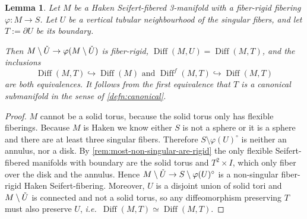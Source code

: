 \documentclass{amsart}
\theoremstyle{plain}
\newtheorem{lem}[thm]{Lemma}
\theoremstyle{definition}
\DeclareMathOperator\Diff{Diff}
\newcommand{\interior}[1]{\smash{\mathring{#1}}}
\begin{document}
\begin{lem}\label{lem:singular-fiber-canonical}
    Let $M$ be a Haken Seifert-fibered 3-manifold with a fiber-rigid fibering $\varphi\colon M \to S$.
    Let $U$ be a vertical tubular neighbourhood of the singular fibers, and let $T := \partial U$ be its boundary. 
    
    Then $M \setminus \interior{U} \to \varphi(M \setminus \interior{U})$ is fiber-rigid,
    $\Diff(M, U) = \Diff(M, T)$, and the inclusions
    \[  
        \Diff(M, T) \hookrightarrow \Diff(M) \text{ and } \Diff^f(M, T)\hookrightarrow \Diff(M,T)
    \]
    are both equivalences.
    It follows from the first equivalence that $T$ is a canonical submanifold in the sense of \cref{defn:canonical}.
\end{lem}
\begin{proof}
    $M$ cannot be a solid torus, because the solid torus only has flexible fiberings. 
    Because $M$ is Haken we know either $S$ is not a sphere or it is a sphere and there are at least three singular fibers.
    Therefore $S \setminus \varphi(U)^\circ$ is neither an annulus, nor a disk. 
    By \cref{rem:most-non-singular-are-rigid} the only flexible Seifert-fibered manifolds with boundary are the solid torus and $T^2 \times I$, which only fiber over the disk and the annulus.
    Hence $M \setminus \interior{U} \to S \setminus \varphi(U)^\circ$ is a non-singular fiber-rigid Haken Seifert-fibering.
    Moreover, $U$ is a disjoint union of solid tori and $M \setminus \interior{U}$ is connected and not a solid torus, so any diffeomorphism preserving $T$ must also preserve $U$, \emph{i.e.}~$\Diff(M,T)\simeq \Diff(M,T)$.



\end{proof}
\end{document}
